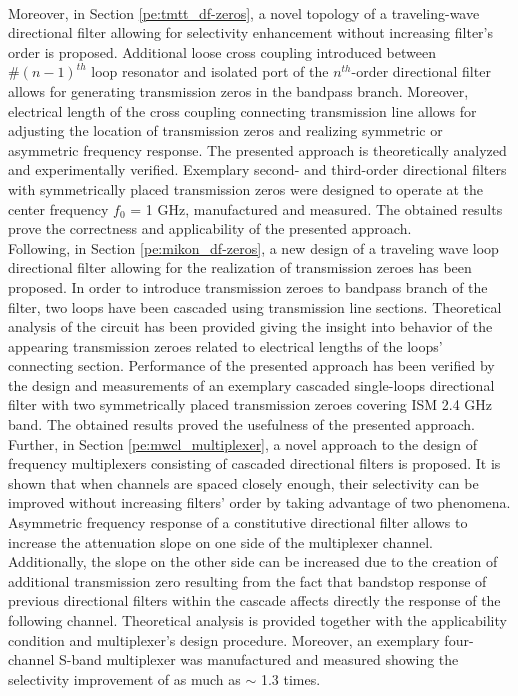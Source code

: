 \\
\indent Moreover, in Section \ref{pe:tmtt_df-zeros}, a novel topology of a traveling-wave directional filter allowing for selectivity enhancement without increasing filter’s order is proposed. Additional loose cross coupling introduced between $\#(n-1)^{th}$ loop resonator and isolated port of the $n^{th}$-order directional filter allows for generating transmission zeros in the bandpass branch. Moreover, electrical length of the cross coupling connecting transmission line allows for adjusting the location of transmission zeros and realizing symmetric or asymmetric frequency response. The presented approach is theoretically analyzed and experimentally verified. Exemplary second- and third-order directional filters with symmetrically placed transmission zeros were designed to operate at the center frequency $f_0$ = 1 GHz, manufactured and measured. The obtained results prove the correctness and applicability of the presented approach.
\\
\indent Following, in Section \ref{pe:mikon_df-zeros}, a new design of a traveling wave loop directional filter allowing for the realization of transmission zeroes has been proposed. In order to introduce transmission zeroes to bandpass branch of the filter, two loops have been cascaded using transmission line sections. Theoretical analysis of the circuit has been provided giving the insight into behavior of the appearing transmission zeroes related to electrical lengths of the loops’ connecting section. Performance of the presented approach has been verified by the design and measurements of an exemplary cascaded single-loops directional filter with two symmetrically placed transmission zeroes covering ISM 2.4 GHz band. The obtained results proved the usefulness of the presented approach.
\\
\indent Further, in Section \ref{pe:mwcl_multiplexer}, a novel approach to the design of frequency multiplexers consisting of cascaded directional filters is proposed. It is shown that when channels are spaced closely enough, their selectivity can be improved without increasing filters' order by taking advantage of two phenomena. Asymmetric frequency response of a constitutive directional filter allows to increase the attenuation slope on one side of the multiplexer channel. Additionally, the slope on the other side can be increased due to the creation of additional transmission zero resulting from the fact that bandstop response of previous directional filters within the cascade affects directly the response of the following channel. Theoretical analysis is provided together with the applicability condition and multiplexer's design procedure. Moreover, an exemplary four-channel S-band multiplexer was manufactured and measured showing the selectivity improvement of as much as $\sim$ 1.3 times.
